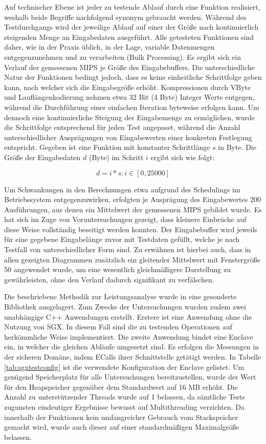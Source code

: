 Auf technischer Ebene ist jeder zu testende Ablauf durch eine Funktion realisiert, weshalb beide Begriffe nachfolgend synonym gebraucht werden. Während des Testdurchgangs wird der jeweilige Ablauf auf einer der Größe nach kontinuierlich steigenden Menge an Eingabedaten ausgeführt. Alle getesteten Funktionen sind daher, wie in der Praxis üblich, in der Lage, variable Datenmengen entgegenzunehmen und zu verarbeiten (Bulk Processing). Es ergibt sich ein Verlauf der gemessenen \ac{MIPS} je Größe des Eingabebuffers. Die unterschiedliche Natur der Funktionen bedingt jedoch, dass es keine einheitliche Schrittfolge geben kann, nach welcher sich die Eingabegröße erhöht. Kompressionen durch VByte und Lauflängenkodierung nehmen etwa 32 Bit (4 Byte) Integer Werte entgegen, während die Durchführung einer einfachen Iteration byteweise erfolgen kann. Um dennoch eine kontinuierliche Steigung der Eingabemenge zu ermöglichen, wurde die Schrittfolge entsprechend für jeden Test angepasst, während die Anzahl unterschiedlicher Ausprägungen von Eingabewerten einer konkreten Festlegung entspricht. Gegeben ist eine Funktion mit konstanter Schrittlänge $s$ in Byte. Die Größe der Eingabedaten $d$ (Byte) im Schritt $i$ ergibt sich wie folgt: 

\begin{equation*}
	d = i * s; i \in [0, 25000]
\end{equation*}

Um Schwankungen in den Berechnungen etwa aufgrund des Schedulings im Betriebssystem entgegenzuwirken, erfolgten je Ausprägung des Eingabewertes 200 Ausführungen, aus denen ein Mittelwert der gemessenen MIPS gebildet wurde. Es hat sich im Zuge von Voruntersuchungen gezeigt, dass kleinere Einbrüche auf diese Weise vollständig beseitigt werden konnten. Der Eingabebuffer wird jeweils für eine gegebene Eingabelänge zuvor mit Testdaten gefüllt, welche je nach Testfall von unterschiedlicher Form sind. Zu erwähnen ist hierbei auch, dass in allen gezeigten Diagrammen zusätzlich ein gleitender Mittelwert mit Fenstergröße 50 angewendet wurde, um eine wesentlich gleichmäßigere Darstellung zu gewährleisten, ohne den Verlauf dadurch signifikant zu verfälschen.

Die beschriebene Methodik zur Leistungsanalyse wurde in eine gesonderte Bibliothek ausgelagert. Zum Zwecke der Untersuchungen wurden zudem zwei unabhängige C++ Anwendungen erstellt. Erstere ist eine Anwendung ohne die Nutzung von \ac{SGX}. In diesem Fall sind die zu testenden Operationen auf herkömmliche Weise implementiert. Die zweite Anwendung bindet eine Enclave ein, in welcher die gleichen Abläufe umgesetzt sind. Es erfolgen die Messungen in der sicheren Domäne, indem \acp{ECall} ihrer Schnittstelle getätigt werden. In Tabelle \ref{tab:sgxtestconfig} ist die verwendete Konfiguration der Enclave gelistet. Um genügend Speicherplatz für alle Untersuchungen bereitzustellen, wurde der Wert für den Heapspeicher gegenüber dem Standardwert auf 16 MB erhöht. Die Anzahl zu unterstützender Threads wurde auf 1 belassen, da sämtliche Tests zugunsten eindeutiger Ergebnisse bewusst auf Multithreading verzichten. Da innerhalb der Funktionen kein umfangreicher Gebrauch vom Stackspeicher gemacht wird, wurde auch dieser auf einer standardmäßigen Maximalgröße belassen.

